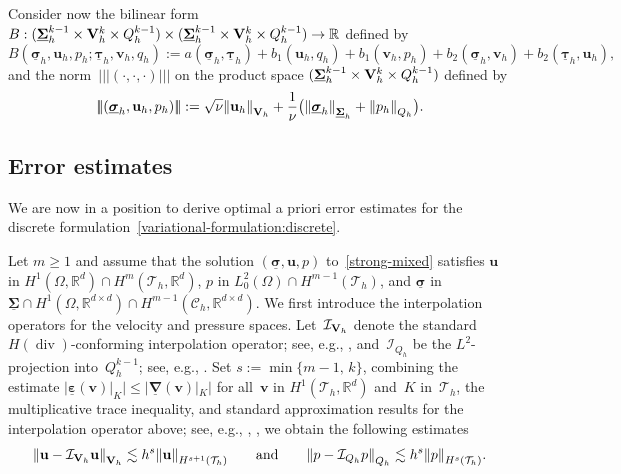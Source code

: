 \documentclass[a4paper,twoside,10pt]{article}
\theoremstyle{plain}
\theoremstyle{remark}
\theoremstyle{definition}
\numberwithin{equation}{section}
\numberwithin{figure}{section}
\newcommand{\Norm}[1]{{\left\|{#1} \right\|}}
\newcommand{\Normthreebars}[3]{\left|\!\left|\!\left| (#1,#2,#3) \right|\!\right|\!\right|}
\newcommand{\Ccalh}{\mathcal{C}_h}
\newcommand{\Tauh}{\mathcal{T}_h}
\newcommand{\Rbb}{\mathbb{R}}
\newcommand{\Rbbd}{\mathbb{R}^d}
\newcommand{\Rbbdd}{\mathbb{R}^{d\times d}}
\newcommand{\K}{K}
\newcommand{\Sigmah}{\underline{\boldsymbol{\Sigma}}_h}
\newcommand{\Sigmahkmo}{\Sigmah^{k-1}}
\newcommand{\Vh}{{\bf{V}}_h}
\newcommand{\Vhk}{\Vh^k}
\newcommand{\Qh}{Q_h}
\newcommand{\Qhkmo}{\Qh^{k-1}}
\newcommand{\taubfh}{\underline{\boldsymbol{\tau}}_h}
\newcommand{\vbfh}{\mathbf{v}_h}
\newcommand{\qh}{q_h}
\newcommand{\sigmabfh}{\underline{\boldsymbol{\sigma}}_h}
\newcommand{\ubfh}{\mathbf{u}_h}
\newcommand{\ph}{p_h}
\newcommand{\vbf}{\mathbf{v}}
\newcommand{\sigmabf}{\underline{\boldsymbol{\sigma}}}
\newcommand{\ubf}{\mathbf{u}}
\DeclareMathOperator{\dive}{div}
\newcommand{\Ltwo}{L^2}
\newcommand{\bone}{b_1}
\newcommand{\btwo}{b_2}
\newcommand{\epsbfun}{\underline{\boldsymbol{\varepsilon}}}
\newcommand{\nablabfun}{\underline{\boldsymbol{\nabla}}}
\newcommand{\IcalQhkmo}{\mathcal{I}_{\Qh}}
\newcommand{\IcalVhk}{\mathcal{I}_{\Vh}}
\newcommand{\Sigmabf}{\underline{\boldsymbol{\Sigma}}}
\begin{document}
Consider now the bilinear form
$B: (\Sigmahkmo\times\Vhk\times\Qhkmo) \times (\Sigmahkmo\times\Vhk\times\Qhkmo) \to \Rbb$
defined by
\begin{equation} \label{bilinear-form:B}
B(\sigmabfh,\ubfh,\ph;\taubfh,\vbfh,\qh)
:= a(\sigmabfh,\taubfh) + \bone(\ubfh,\qh) + \bone(\vbfh,\ph) + \btwo(\sigmabfh,\vbfh) + \btwo(\taubfh,\ubfh),
\end{equation}
and the norm~$\Normthreebars{\cdot}{\cdot}{\cdot}$ on the product space $(\Sigmahkmo\times\Vhk\times\Qhkmo)$
defined by
\begin{equation} \label{norm-three-bars}
\Normthreebars{\sigmabfh}{\ubfh}{\ph}
:= \sqrt{\nu}\Norm{\ubfh}_{\Vh}
    + \frac{1}{\nu}\big(\Norm{\sigmabfh}_{\Sigmah} + \Norm{\ph}_{\Qh}\big).
\end{equation}

\subsection{Error estimates} \label{subsection:error-estimates}
We are now in a position to derive
optimal a priori error estimates
for the discrete formulation~\eqref{variational-formulation:discrete}.


Let $m \geq 1$ and assume that the solution $(\sigmabf,\ubf,p)$ to~\eqref{strong-mixed} satisfies
$\ubf$ in $H^1(\Omega,\Rbbd)\cap H^{m}(\Tauh,\Rbbd)$,
$p$ in $L^2_0(\Omega)\cap H^{m-1}(\Tauh)$,
and
$\sigmabf$ in $\Sigmabf\cap H^1(\Omega,\Rbbdd)\cap H^{m-1}(\Ccalh,\Rbbdd)$.
We first introduce the interpolation operators for the velocity and pressure spaces.
Let~$\IcalVhk$ denote the standard $H(\dive)$-conforming interpolation operator;
see, e.g., \cite[Eq.~(2.5.26)]{Boffi-Brezzi-Fortin:2013},
and~$\IcalQhkmo$ be the $\Ltwo$-projection into~$\Qhkmo$;
see, e.g., \cite[Eq.~(18.30)]{Ern-Guermond:1}.
Set $s := \min\{m-1,\,k\}$,
combining the estimate
$|\epsbfun(\vbf)|_{\K}| \leq |\nablabfun(\vbf)|_{\K}|$ for all~$\vbf$ in $H^1(\Tauh,\Rbbd)$ and~$\K$ in~$\Tauh$,
the multiplicative trace inequality,
and standard approximation results for the interpolation operator above; see, e.g.,
\cite[Prop.~2.5.4]{Boffi-Brezzi-Fortin:2013},
\cite[Thm.~18.16]{Ern-Guermond:1},
we obtain the following estimates
\begin{equation} \label{approximation:V-Q}
\Norm{\ubf-\IcalVhk\ubf}_{\Vh} \lesssim h^s\Norm{\ubf}_{H^{s+1}(\Tauh)}
\qquad\text{and}\qquad
\Norm{p - \IcalQhkmo p}_{\Qh} \lesssim h^s\Norm{p}_{H^s(\Tauh)}.
\end{equation}
\end{document}
